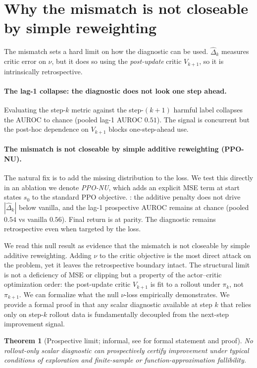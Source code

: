 \documentclass{article}
\newtheorem*{theorem*}{Theorem}
\begin{document}
\section{Why the mismatch is not closeable by simple reweighting}
\label{sec:intervention}

The mismatch sets a hard limit on how the diagnostic can be used. $\hat\Delta_k$ measures critic error on $\nu$, but it does so using the \emph{post-update} critic $V_{k+1}$, so it is intrinsically retrospective. 

\paragraph{The lag-1 collapse: the diagnostic does not look one step ahead.}
Evaluating the step-$k$ metric against the step-$(k{+}1)$ harmful label collapses the AUROC to chance (pooled lag-1 AUROC $0.51$). The signal is concurrent but the post-hoc dependence on $V_{k+1}$ blocks one-step-ahead use.

\paragraph{The mismatch is not closeable by simple additive reweighting (PPO-NU).}
The natural fix is to add the missing distribution to the loss. We test this directly in an ablation we denote \emph{PPO-NU}, which adds an explicit MSE term at start states $s_0$ to the standard PPO objective. : the additive penalty does not drive $|\hat\Delta_k|$ below vanilla, and the lag-1 prospective AUROC remains at chance (pooled $0.54$ vs vanilla $0.56$). Final return is at parity. The diagnostic remains retrospective even when targeted by the loss.

We read this null result as evidence that the mismatch is not closeable by simple additive reweighting. Adding $\nu$ to the critic objective is the most direct attack on the problem, yet it leaves the retrospective boundary intact. The structural limit is not a deficiency of MSE or clipping but a property of the actor--critic optimization order: the post-update critic $V_{k+1}$ is fit to a rollout under $\pi_k$, not $\pi_{k+1}$. We can formalize what the null $\nu$-loss empirically demonstrates. We provide a formal proof in  that any scalar diagnostic available at step $k$ that relies only on step-$k$ rollout data is fundamentally decoupled from the next-step improvement signal.

\begin{theorem*}[Prospective limit; informal, see  for formal statement and proof]
No rollout-only scalar diagnostic can prospectively certify improvement under typical conditions of exploration and finite-sample or function-approximation fallibility.
\end{theorem*}
\end{document}
